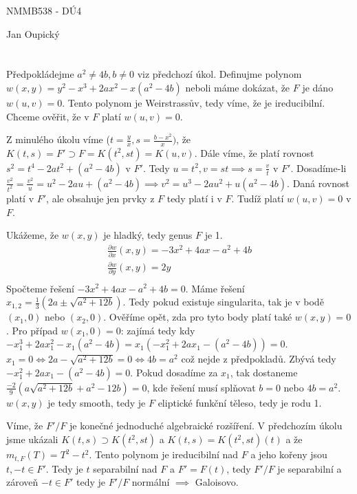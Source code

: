 \documentclass[12pt, a4paper]{article}
\begin{document}
\begin{center}
\large NMMB538 - DÚ4

\normalsize Jan Oupický
\end{center}
\vspace{1\baselineskip}

\section{}
Předpokládejme $a^2 \neq 4b, b \neq 0$ viz předchozí úkol. Definujme polynom $w(x,y) = y^2 - x^3 + 2ax^2 - x(a^2-4b)$ neboli máme dokázat, že $F$ je dáno $w(u,v)=0$. Tento polynom je Weirstrassův, tedy víme, že je ireducibilní. Chceme ověřit, že v $F$ platí $w(u,v)=0$.

Z minulého úkolu víme ($t=\frac{y}{x}, s=\frac{b-x^2}{x})$, že $K(t,s)=F' \supset F = K(t^2, st) = K(u,v)$. Dále víme, že platí rovnost $s^2 = t^4 - 2at^2 + (a^2-4b)$ v $F'$. Tedy $u = t^2, v = st \implies s = \frac{v}{t}$ v $F'$. Dosadíme-li $\frac{v^2}{t^2}=\frac{v^2}{u} = u^2-2au+(a^2-4b) \implies v^2 = u^3-2au^2+u(a^2-4b)$. Daná rovnost platí v $F'$, ale obsahuje jen prvky z $F$ tedy platí i v $F$. Tudíž platí $w(u,v)=0$ v $F$.

Ukážeme, že $w(x,y)$ je hladký, tedy genus $F$ je 1.
\begin{gather*}
\frac{\partial w}{\partial x} (x,y) = -3x^2 + 4ax - a^2 + 4b\\
\frac{\partial w}{\partial y} (x,y) = 2y\\
\end{gather*}
Spočteme řešení $-3x^2 + 4ax - a^2 + 4b = 0$. Máme řešení $x_{1,2} = \frac{1}{3}(2a\pm \sqrt{a^2+12b})$. Tedy pokud existuje singularita, tak je v bodě $(x_1, 0)$ nebo $(x_2, 0)$. Ověříme opět, zda pro tyto body platí také $w(x,y)=0$. Pro případ $w(x_1,0) = 0$: zajímá tedy kdy $- x_1^3 + 2ax_1^2 - x_1(a^2-4b) = x_1(- x_1^2 + 2ax_1 -(a^2-4b)) = 0$. $x_1 = 0 \iff 2a - \sqrt{a^2+12b} = 0 \iff 4b = a^2$ což nejde z předpokladů. Zbývá tedy $- x_1^2 + 2ax_1 -(a^2-4b) = 0$. Pokud dosadíme za $x_1$, tak dostaneme $\frac{-2}{9}\left(a \sqrt{a^2+12 b}+a^2-12 b\right) = 0$, kde řešení musí splňovat $b=0$ nebo $4b = a^2$.
$w(x,y)$ je tedy smooth, tedy je $F$ eliptické funkční těleso, tedy je rodu 1.

Víme, že $F'/F$ je konečné jednoduché algebraické rozšíření. V předchozím úkolu jsme ukázali $K(t,s)\supset K(t^2,st)$ a $K(t,s)=K(t^2,st)(t)$ a že $m_{t,F}(T)=T^2-t^2$. Tento polynom je ireducibilní nad $F$ a jeho kořeny jsou $t,-t \in F'$. Tedy je $t$ separabilní nad $F$ a $F'=F(t)$, tedy $F'/F$ je separabilní a zároveň $-t \in F'$ tedy je $F'/F$ normální $\implies$ Galoisovo.
\end{document}

